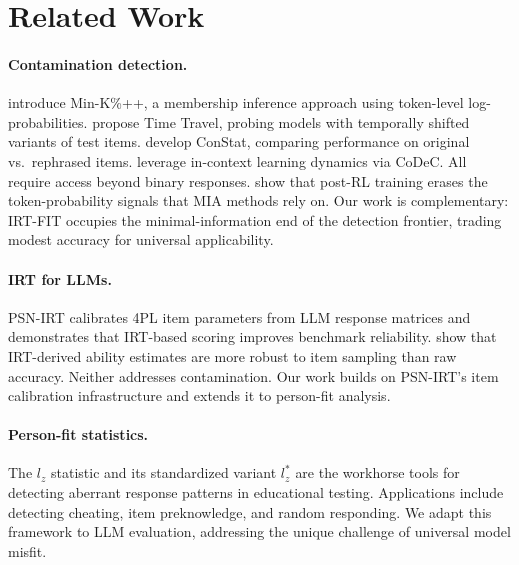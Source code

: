 \documentclass[11pt,a4paper]{article}
\begin{document}
\section{Related Work}

\paragraph{Contamination detection.}
\citet{shi2024detecting} introduce Min-K\%++, a membership inference approach using token-level log-probabilities.
\citet{oren2024proving} propose Time Travel, probing models with temporally shifted variants of test items.
\citet{li2024constat} develop ConStat, comparing performance on original vs.\ rephrased items.
\citet{wu2026codec} leverage in-context learning dynamics via CoDeC.
All require access beyond binary responses.
\citet{wang2025mia} show that post-RL training erases the token-probability signals that MIA methods rely on.
Our work is complementary: IRT-FIT occupies the minimal-information end of the detection frontier, trading modest accuracy for universal applicability.

\paragraph{IRT for LLMs.}
PSN-IRT \citep{polo2024psnirt} calibrates 4PL item parameters from LLM response matrices and demonstrates that IRT-based scoring improves benchmark reliability.
\citet{zhuang2024irtllm} show that IRT-derived ability estimates are more robust to item sampling than raw accuracy.
Neither addresses contamination.
Our work builds on PSN-IRT's item calibration infrastructure and extends it to person-fit analysis.

\paragraph{Person-fit statistics.}
The $l_z$ statistic \citep{drasgow1985} and its standardized variant $l_z^*$ \citep{snijders2001} are the workhorse tools for detecting aberrant response patterns in educational testing.
Applications include detecting cheating, item preknowledge, and random responding.
We adapt this framework to LLM evaluation, addressing the unique challenge of universal model misfit.

\end{document}
